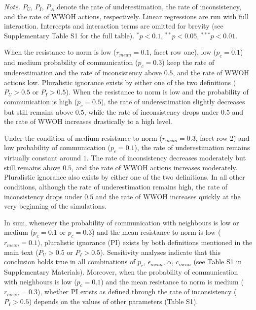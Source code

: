 \documentclass[
  11pt,
]{article}
\begin{document}
\begin{table}
\begin{threeparttable}
\begin{tabular}[t]{>{\raggedright\arraybackslash}p{0.5in}ccccccccc}
\bottomrule
\end{tabular}
\begin{tablenotes}
\small
\item \textit{Note.} $P_U$, $P_I$, $P_A$ denote the rate of underestimation, the rate of inconsistency, and the rate of WWOH actions, respectively. Linear regressions are run with full interaction. Intercepts and interaction terms are omitted for brevity (see Supplementary Table S1 for the full table). $^*p < 0.1, \,^{**} p < 0.05, \, ^{***} p < 0.01$.
\end{tablenotes}
\end{threeparttable}
\label{tab:2}
\end{table}

\endgroup

When the resistance to norm is low (\(r_{mean} = 0.1\), facet row one),
low (\(p_c = 0.1\)) and medium probability of communication
(\(p_c = 0.3\)) keep the rate of underestimation and the rate of
inconsistency above \(0.5\), and the rate of WWOH actions low.
Pluralistic ignorance exists by either one of the two definitions
(\(P_U > 0.5\) or \(P_I > 0.5\)). When the resistance to norm is low and
the probability of communication is high (\(p_c = 0.5\)), the rate of
underestimation slightly decreases but still remains above \(0.5\),
while the rate of inconsistency drops under \(0.5\) and the rate of WWOH
increases drastically to a high level.

Under the condition of medium resistance to norm (\(r_{mean} = 0.3\),
facet row 2) and low probability of communication (\(p_c = 0.1\)), the
rate of underestimation remains virtually constant around \(1\). The
rate of inconsistency decreases moderately but still remains above
\(0.5\), and the rate of WWOH actions increases moderately. Pluralistic
ignorance also exists by either one of the two definitions. In all other
conditions, although the rate of underestimation remains high, the rate
of inconsistency drops under \(0.5\) and the rate of WWOH increases
quickly at the very beginning of the simulations.

In sum, whenever the probability of communication with neighbours is low
or medium (\(p_c = 0.1\) or \(p_c = 0.3\)) and the mean resistance to
norm is low (\(r_{mean} = 0.1\)), pluralistic ignorance (PI) exists by
both definitions mentioned in the main text (\(P_U > 0.5\) or
\(P_I > 0.5\)). Sensitivity analyses indicate that this conclusion holds
true in all combinations of \(p_r\), \(\epsilon_{mean}\), \(\alpha\),
\(c_{mean}\) (see Table S1 in Supplementary Materials). Moreover, when
the probability of communication with neighbours is low (\(p_c = 0.1\))
and the mean resistance to norm is medium (\(r_{mean} = 0.3\)), whether
PI exists as defined through the rate of inconsistency (\(P_I > 0.5\))
depends on the values of other parameters (Table S1).
\end{document}
